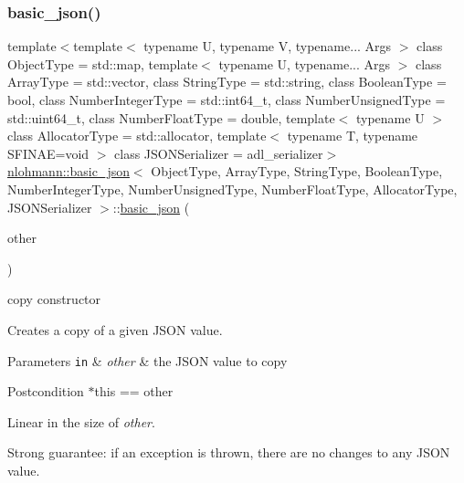 \subsubsection{\texorpdfstring{basic\+\_\+json()}{basic\_json()}\hspace{0.1cm}{\footnotesize\ttfamily [8/9]}}
{\footnotesize\ttfamily template$<$template$<$ typename U, typename V, typename... Args $>$ class Object\+Type = std\+::map, template$<$ typename U, typename... Args $>$ class Array\+Type = std\+::vector, class String\+Type  = std\+::string, class Boolean\+Type  = bool, class Number\+Integer\+Type  = std\+::int64\+\_\+t, class Number\+Unsigned\+Type  = std\+::uint64\+\_\+t, class Number\+Float\+Type  = double, template$<$ typename U $>$ class Allocator\+Type = std\+::allocator, template$<$ typename T, typename S\+F\+I\+N\+A\+E=void $>$ class J\+S\+O\+N\+Serializer = adl\+\_\+serializer$>$ \\
\mbox{\hyperlink{classnlohmann_1_1basic__json}{nlohmann\+::basic\+\_\+json}}$<$ Object\+Type, Array\+Type, String\+Type, Boolean\+Type, Number\+Integer\+Type, Number\+Unsigned\+Type, Number\+Float\+Type, Allocator\+Type, J\+S\+O\+N\+Serializer $>$\+::\mbox{\hyperlink{classnlohmann_1_1basic__json}{basic\+\_\+json}} (\begin{DoxyParamCaption}\item[{const \mbox{\hyperlink{classnlohmann_1_1basic__json}{basic\+\_\+json}}$<$ Object\+Type, Array\+Type, String\+Type, Boolean\+Type, Number\+Integer\+Type, Number\+Unsigned\+Type, Number\+Float\+Type, Allocator\+Type, J\+S\+O\+N\+Serializer $>$ \&}]{other }\end{DoxyParamCaption})\hspace{0.3cm}{\ttfamily [inline]}}



copy constructor 

Creates a copy of a given J\+S\+ON value.


\begin{DoxyParams}[1]{Parameters}
\mbox{\tt in}  & {\em other} & the J\+S\+ON value to copy\\
\hline
\end{DoxyParams}
\begin{DoxyPostcond}{Postcondition}
{\ttfamily $\ast$this == other}
\end{DoxyPostcond}
Linear in the size of {\itshape other}.

Strong guarantee\+: if an exception is thrown, there are no changes to any J\+S\+ON value.

